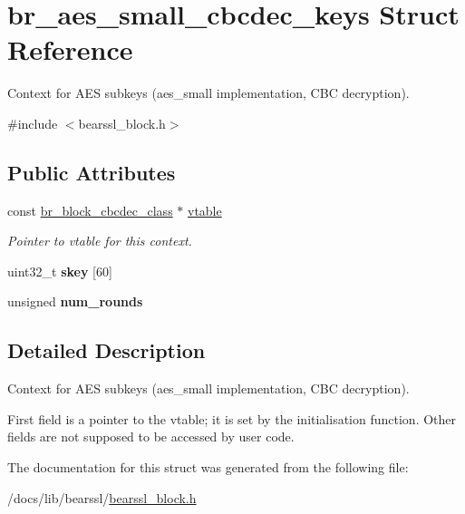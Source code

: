 \hypertarget{structbr__aes__small__cbcdec__keys}{}\section{br\+\_\+aes\+\_\+small\+\_\+cbcdec\+\_\+keys Struct Reference}
\label{structbr__aes__small__cbcdec__keys}


Context for A\+ES subkeys ({\ttfamily aes\+\_\+small} implementation, C\+BC decryption).  




{\ttfamily \#include $<$bearssl\+\_\+block.\+h$>$}

\subsection*{Public Attributes}
\begin{DoxyCompactItemize}
\item 
\mbox{\label{structbr__aes__small__cbcdec__keys_a914be0e021193192cfba5432b8211e1c}} 
const \hyperlink{bearssl__block_8h_a5542970c820eeee2e62766368be8fb7f}{br\+\_\+block\+\_\+cbcdec\+\_\+class} $\ast$ \hyperlink{structbr__aes__small__cbcdec__keys_a914be0e021193192cfba5432b8211e1c}{vtable}
\begin{DoxyCompactList}\small\item\em Pointer to vtable for this context. \end{DoxyCompactList}\item 
\mbox{\label{structbr__aes__small__cbcdec__keys_ad6dd6700b9f657d4a3476e3f6321d375}} 
uint32\+\_\+t {\bfseries skey} \mbox{[}60\mbox{]}
\item 
\mbox{\label{structbr__aes__small__cbcdec__keys_a9b4a897df5ab02f58458e93ff990b5fe}} 
unsigned {\bfseries num\+\_\+rounds}
\end{DoxyCompactItemize}


\subsection{Detailed Description}
Context for A\+ES subkeys ({\ttfamily aes\+\_\+small} implementation, C\+BC decryption). 

First field is a pointer to the vtable; it is set by the initialisation function. Other fields are not supposed to be accessed by user code. 

The documentation for this struct was generated from the following file\+:\begin{DoxyCompactItemize}
\item 
/docs/lib/bearssl/\hyperlink{bearssl__block_8h}{bearssl\+\_\+block.\+h}\end{DoxyCompactItemize}
